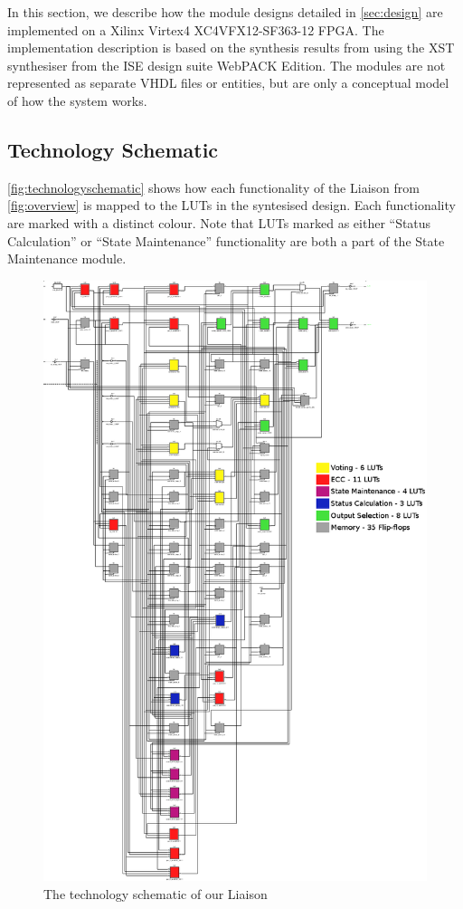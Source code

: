 In this section, we describe how the module designs detailed in
\autoref{sec:design} are implemented on a Xilinx Virtex4
XC4VFX12-SF363-12 FPGA. The implementation description is based on the
synthesis results from using the XST synthesiser from the ISE design
suite WebPACK Edition. The modules are not represented as separate
VHDL files or entities, but are only a conceptual model of how the
system works.

\subsection{Technology Schematic}
\label{sec:technologyschematic}

\autoref{fig:technologyschematic} shows how each functionality
of the Liaison from \autoref{fig:overview} is mapped to the LUTs in
the syntesised design.  Each functionality are marked with a distinct
colour. Note that LUTs marked as either ``Status Calculation'' or
``State Maintenance'' functionality are both a part of the State
Maintenance module.


\begin{figure}[p]
  \vspace*{-1.2in}
  \centerline{ \includegraphics[width=1.2\textwidth]{LUT-count} }
  \caption{The technology schematic of our Liaison}
  \label{fig:technologyschematic}
\end{figure}


